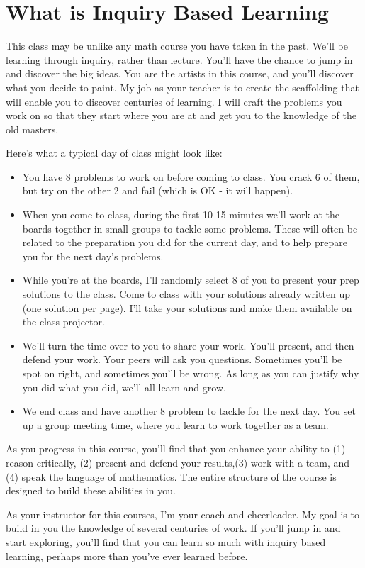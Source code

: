 \documentclass[letterpaper,oneside]{book}%
\theoremstyle{plain}
\theoremstyle{box}
\theoremstyle{problem}
\begin{document}
\section*{What is Inquiry Based Learning}
This class may be unlike any math course you have taken in the past. We'll be learning through inquiry, rather than lecture. 
You'll have the chance to jump in and discover the big ideas. 
You are the artists in this course, and you'll discover what you decide to paint. 
My job as your teacher is to create the scaffolding that will enable you to discover centuries of learning.
I will craft the problems you work on so that they start where you are at and get you to the knowledge of the old masters. 

Here's what a typical day of class might look like:
\begin{itemize}
 \item You have 8 problems to work on before coming to class.  You crack 6 of them, but try on the other 2 and fail (which is OK - it will happen).
 \item When you come to class, during the first 10-15 minutes we'll work at the boards together in small groups to tackle some problems. These will often be related to the preparation you did for the current day, and to help prepare you for the next day's problems.
 \item While you're at the boards, I'll randomly select 8 of you to present your prep solutions to the class.  Come to class with your solutions already written up (one solution per page). I'll take your solutions and make them available on the class projector. 
\item We'll turn the time over to you to share your work. You'll present, and then defend your work. Your peers will ask you questions. Sometimes you'll be spot on right, and sometimes you'll be wrong. As long as you can justify why you did what you did, we'll all learn and grow. 
 \item We end class and have another 8 problem to tackle for the next day. You set up a group meeting time, where you learn to work together as a team. 
\end{itemize}
As you progress in this course, you'll find that you enhance your ability to (1) reason critically, (2) present and defend your results,(3) work with a team, and (4) speak the language of mathematics. The entire structure of the course is designed to build these abilities  in you.

As your instructor for this courses, I'm your coach and cheerleader. My goal is to build in you the knowledge of several centuries of work. If you'll jump in and start exploring, you'll find that you can learn so much with inquiry based learning, perhaps more than you've ever learned before.
\end{document}
